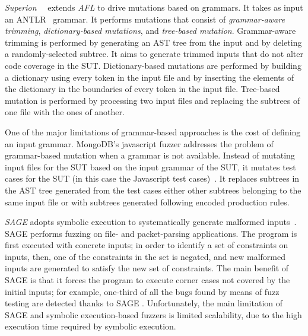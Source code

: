 \emph{Superion}~\Superion~ extends \emph{AFL} to drive mutations based on grammars. It takes as input an ANTLR~\cite{ANTLR} grammar. 
It performs mutations that consist of \emph{grammar-aware trimming}, \emph{dictionary-based mutations}, and \emph{tree-based mutation}.
Grammar-aware trimming is performed by generating an AST tree from the input and by deleting a randomly-selected subtree. 
It aims to generate trimmed inputs that do not alter code coverage in the SUT.
Dictionary-based mutations are performed by building a dictionary using every token in the input file and by inserting the elements of the dictionary in the boundaries of every token in the input file.
Tree-based mutation is performed by processing two input files and replacing the subtrees of one file with the ones of another.

One of the major limitations of grammar-based approaches is the cost of defining an input grammar. MongoDB's javascript fuzzer addresses the problem of grammar-based mutation when a grammar is not available. Instead of mutating input files for the SUT based on the input grammar of  the SUT, it mutates test cases for the SUT (in this case the Javascript test cases)~\MongoDB. It replaces subtrees in the AST tree generated from the test cases either other subtrees belonging to the same input file or with subtrees generated following encoded production rules.





\emph{SAGE} adopts symbolic execution to systematically generate malformed inputs~\cite{godefroid2012sage}. SAGE performs fuzzing on file- and packet-parsing applications. 
The program is first executed with concrete inputs; in order to identify a set of constraints on inputs, then, one of the constraints in the set is negated, and new malformed inputs are generated to satisfy the new set of constraints. 
The main benefit of SAGE is that it forces the program to execute corner cases not covered by the initial inputs; for example, 
one-third of all the bugs found by means of fuzz testing are detected thanks to SAGE \cite{bounimova2013billions}.
Unfortunately, the main limitation of SAGE and symbolic execution-based fuzzers is limited scalability, due to the high execution time required by symbolic execution.


